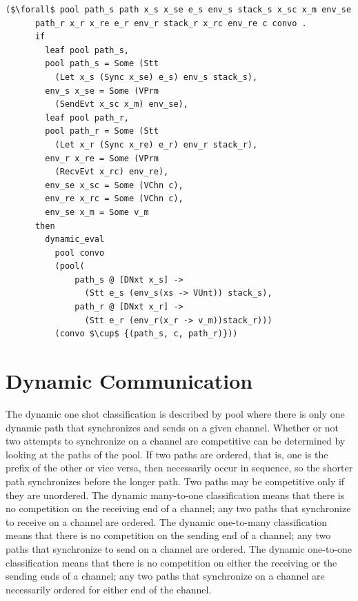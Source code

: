 \documentclass{article}
\begin{document}
\begin{lstlisting}[language=logic, mathescape]
    ($\forall$ pool path_s path x_s x_se e_s env_s stack_s x_sc x_m env_se
      path_r x_r x_re e_r env_r stack_r x_rc env_re c convo .
      if 
        leaf pool path_s,
        pool path_s = Some (Stt
          (Let x_s (Sync x_se) e_s) env_s stack_s),
        env_s x_se = Some (VPrm
          (SendEvt x_sc x_m) env_se),
        leaf pool path_r,
        pool path_r = Some (Stt
          (Let x_r (Sync x_re) e_r) env_r stack_r),
        env_r x_re = Some (VPrm
          (RecvEvt x_rc) env_re),
        env_se x_sc = Some (VChn c),
        env_re x_rc = Some (VChn c), 
        env_se x_m = Some v_m
      then
        dynamic_eval
          pool convo
          (pool(
              path_s @ [DNxt x_s] ->
                (Stt e_s (env_s(xs -> VUnt)) stack_s), 
              path_r @ [DNxt x_r] ->
                (Stt e_r (env_r(x_r -> v_m))stack_r))) 
          (convo $\cup$ {(path_s, c, path_r)}))
  \end{lstlisting}

\section{Dynamic Communication}

The dynamic one shot classification is described by pool where there is only one dynamic path
that synchronizes and sends on a given channel. Whether or not two attempts to
synchronize on a channel are competitive can be determined by
looking at the paths of the pool. If two paths are ordered, that is, one is the
prefix of the other or vice versa, then necessarily
occur in sequence, so the shorter path synchronizes before the longer path. Two paths may
be competitive only if they are unordered. The dynamic many-to-one classification means that
there is no competition on the receiving end of a channel; any two paths that synchronize to
receive on a channel are ordered. The dynamic one-to-many classification means that there
is no competition on the sending end of a channel; any two paths that synchronize to
send on a channel are ordered. The dynamic one-to-one classification means that there is no
competition on either the receiving or the sending ends of a channel; any two paths that
synchronize on a channel are necessarily ordered for either end of the channel. 
\end{document}
